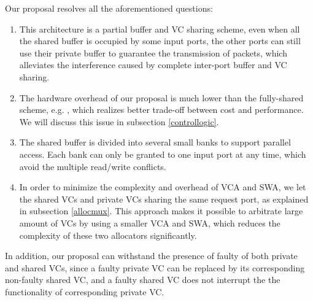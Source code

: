 \documentclass[10pt,conference]{IEEEtran}
\begin{document}
Our proposal resolves all the aforementioned questions:
\begin{enumerate}
\item This architecture is a partial buffer and VC sharing scheme, even when all the shared buffer is occupied by some input ports, the other ports can still use their private buffer to guarantee the transmission of packets, which alleviates the interference caused by complete inter-port buffer and VC sharing.
\item The hardware overhead of our proposal is much lower than the fully-shared scheme, e.g. \cite{Neishaburi:2009:RAN:1531542.1531658}\cite{5770788}, which realizes better trade-off between cost and performance. We will discuss this issue in subsection \ref{controllogic}.
\item The shared buffer is divided into several small banks to support parallel access. Each bank can only be granted to one input port at any time, which avoid the multiple read/write conflicts.
\item In order to minimize the complexity and overhead of VCA and SWA, we let the shared VCs and private VCs sharing the same request port, as explained in subsection \ref{allocmux}. This approach makes it possible to arbitrate large amount of VCs by using a smaller VCA and SWA, which reduces the complexity of these two allocators significantly.
\end{enumerate}

In addition, our proposal can withstand the presence of faulty of both private and shared VCs, since a faulty private VC can be replaced by its corresponding non-faulty shared VC, and a faulty shared VC does not interrupt the the functionality of corresponding private VC.

\end{document}
